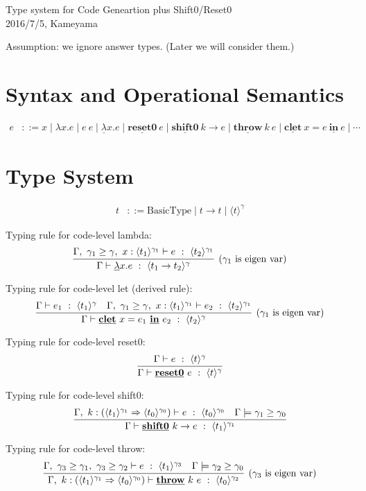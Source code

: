 \documentclass{jarticle}
\newcommand\fun[2]{\lambda{#1}.{#2}}
\newcommand\cfun[2]{\underline{\lambda}{#1}.{#2}}
\newcommand\cResetz{\underline{\textbf{reset0}}}
\newcommand\cShiftz{\underline{\textbf{shift0}}}
\newcommand\cThrow{\underline{\textbf{throw}}}
\newcommand\cresetz[1]{\cResetz~{#1}}
\newcommand\cshiftz[2]{\cShiftz~{#1}\to{#2}}
\newcommand\cthrow[2]{\cThrow~{#1}~{#2}}
\newcommand\cLet{\underline{\textbf{clet}}}
\newcommand\cIn{\underline{\textbf{in}}}
\newcommand\clet[3]{\cLet~{#1}={#2}~\cIn~{#3}}
\newcommand\codeT[2]{\langle{#1}\rangle^{#2}}
\newcommand\contT[2]{({#1} \Rightarrow {#2})}
\newcommand\ord{\ge}
\begin{document}
\begin{center}
  \Large
  Type system for Code Geneartion plus Shift0/Reset0
  \\
  2016/7/5, Kameyama
\end{center}

Assumption: we ignore answer types.
(Later we will consider them.)

\section{Syntax and Operational Semantics}

\begin{align*}
  e & ::= x \mid \fun{x}{e} \mid e~e
      \mid \cfun{x}{e}
      \mid \cresetz{e}
      \mid \cshiftz{k}{e}
      \mid \cthrow{k}{e}
      \mid \clet{x}{e}{e}
      \mid \cdots
\end{align*}

\section{Type System}

\begin{align*}
  t & ::= \textrm{BasicType} \mid t \to t \mid \codeT{t}{\gamma}
\end{align*}

Typing rule for code-level lambda:
\[
  \infer[(\gamma_1~\text{is eigen var})]
  {\Gamma \vdash \cfun{x}{e} ~:~ \codeT{t_1\to t_2}{\gamma}}
  {\Gamma,~\gamma_1 \ord \gamma,~x:\codeT{t_1}{\gamma_1} \vdash e
    ~:~ \codeT{t_2}{\gamma_1}}
\]

Typing rule for code-level let (derived rule):
\[
  \infer[(\gamma_1~\text{is eigen var})]
  {\Gamma \vdash \clet{x}{e_1}{e_2} ~:~ \codeT{t_2}{\gamma}}
  {\Gamma \vdash e_1 ~:~ \codeT{t_1}{\gamma}
    &\Gamma,~\gamma_1 \ord \gamma,~x:\codeT{t_1}{\gamma_1} \vdash
    e_2 ~:~ \codeT{t_2}{\gamma_1}
  }
\]

Typing rule for code-level reset0:
\[
  \infer{\Gamma \vdash \cresetz{e} ~:~ \codeT{t}{\gamma}}
  {\Gamma \vdash e ~:~ \codeT{t}{\gamma}}
\]

Typing rule for code-level shift0:
\[
  \infer{\Gamma \vdash \cshiftz{k}{e} ~:~ \codeT{t_1}{\gamma_1}}
  {\Gamma,~k:\contT{\codeT{t_1}{\gamma_1}}{\codeT{t_0}{\gamma_0}}
    \vdash e ~:~ \codeT{t_0}{\gamma_0}
    & \Gamma \models \gamma_1 \ord \gamma_0
  }
\]

Typing rule for code-level throw:
\[
  \infer[(\gamma_3~\text{is eigen var})]
  {\Gamma,~k:\contT{\codeT{t_1}{\gamma_1}}{\codeT{t_0}{\gamma_0}}
    \vdash \cthrow{k}{e} ~:~ \codeT{t_0}{\gamma_2}}
  {\Gamma,~
    \gamma_3 \ord \gamma_1,~
    \gamma_3 \ord \gamma_2
    \vdash e ~:~ \codeT{t_1}{\gamma_3}
    & \Gamma \models \gamma_2 \ord \gamma_0
  }
\]
\end{document}
